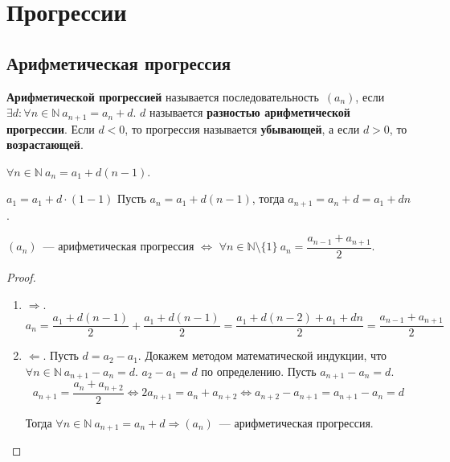 \section{Прогрессии}
\subsection{Арифметическая прогрессия}
 \textbf{Арифметической прогрессией} называется последовательность~$(a_n)$, если $\exists d \colon \forall n \in \mathbb N \ a_{n+1} = a_n + d$.
$d$ называется \textbf{разностью арифметической прогрессии}.
Если $d < 0$, то прогрессия называется \textbf{убывающей}, а если $d > 0$, то \textbf{возрастающей}.

\begin{statement}
$\forall n \in \mathbb N \ a_n = a_1 + d(n - 1)$.
\end{statement}
\begin{proofmathind}
	\indbase $a_1 = a_1 + d \cdot (1 - 1)$
	\indstep Пусть $a_n = a_1 + d(n - 1)$, тогда $a_{n+1} = a_n + d = a_1 + dn$. \indend
\end{proofmathind}

\begin{theorem}
$(a_n)$~--- арифметическая прогрессия $\Leftrightarrow$ $\forall n \in \mathbb N \setminus \{ 1 \} \ a_n = \dfrac{a_{n-1} + a_{n+1}}2$.
\end{theorem}
\begin{proof}
\begin{enumerate}
	\item $\Rightarrow$.
	\begin{equation*}
	a_n = \frac{a_1 + d(n - 1)}2 + \frac{a_1 + d(n - 1)}2 =
	\frac{a_1 + d(n - 2) + a_1 + dn}2 =
	\frac{a_{n-1} + a_{n+1}}2
	\end{equation*}
	
	\item $\Leftarrow$. Пусть $d = a_2 - a_1$.
	Докажем методом математической индукции, что $\forall n \in \mathbb N \ a_{n+1} - a_n = d$.
		\indbase $a_2 - a_1 = d$ по определению.
		\indstep Пусть $a_{n+1} - a_n = d$.
		\begin{equation*}
		a_{n+1} = \frac{a_n + a_{n+2}}2 \Leftrightarrow
		2 a_{n+1} = a_n + a_{n+2} \Leftrightarrow
		a_{n+2} - a_{n+1} = a_{n+1} - a_n = d
		\end{equation*}
		\indend
		
	Тогда $\forall n \in \mathbb N \ a_{n+1} = a_n + d \Rightarrow (a_n)$~--- арифметическая прогрессия.
\end{enumerate}
\end{proof}

